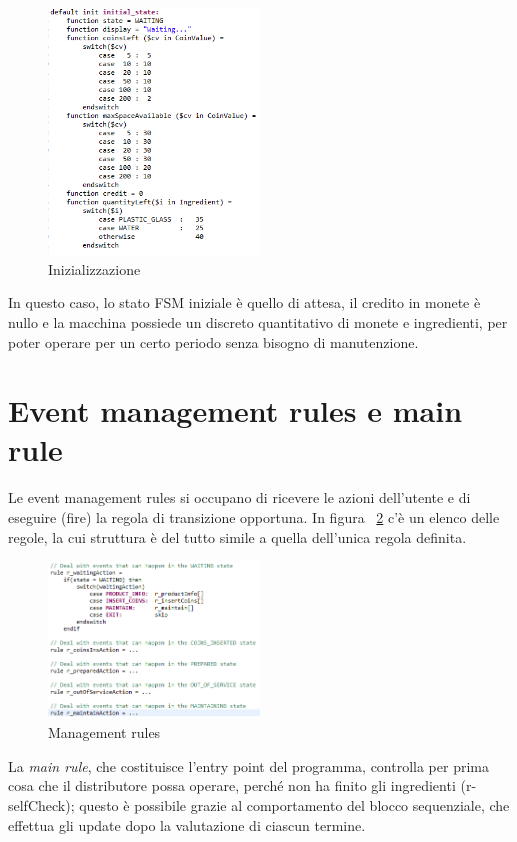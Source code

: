 \begin{figure}[h]
	\centering
	\includegraphics[width=0.5\textwidth]{Immagini/InitialState.png}
	\caption{Inizializzazione}
	\label{fig:initialState}
\end{figure}
In questo caso, lo stato FSM iniziale è quello di attesa, il credito in monete è nullo e la macchina possiede un discreto quantitativo di monete e ingredienti, per poter operare per un certo periodo senza bisogno di manutenzione.

\section{Event management rules e main rule}
Le event management rules si occupano di ricevere le azioni dell’utente e di eseguire (fire) la regola di transizione opportuna. In figura ~\ref{fig:managementRules} c’è un elenco delle regole, la cui struttura è del tutto simile a quella dell’unica regola definita. 

\begin{figure}[h]
	\centering
	\includegraphics[width=0.5\textwidth]{Immagini/ManagementRule.png}
	\caption{Management rules}
	\label{fig:managementRules}
\end{figure}

La \textit{main rule}, che costituisce l’entry point del programma, controlla per prima cosa che il distributore possa operare, perché non ha finito gli ingredienti (r-selfCheck); questo è possibile grazie al comportamento del blocco sequenziale, che effettua gli update dopo la valutazione di ciascun termine. 

